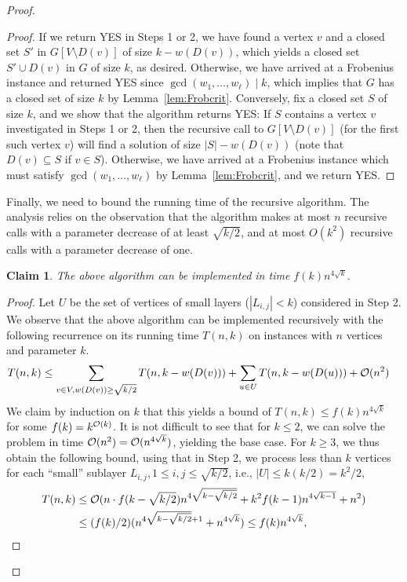\documentclass[10pt,a4paper]{article}
\theoremstyle{plain}
\newtheorem{claim}[thm]{Claim}
\newcommand{\Oh}{{\cal O}}
\newcommand{\divides}{\mid}
\newcommand{\cqed}{}
\begin{document}
\begin{proof}
\begin{proof}
If we return YES in Steps 1 or 2, we have found a vertex $v$ and a closed set $S'$ in $G[V\setminus D(v)]$ of size $k-w(D(v))$, which yields a closed set $S'\cup D(v)$ in $G$ of size $k$, as desired. Otherwise, we have arrived at a Frobenius instance and returned YES since $\gcd(w_1,\dots, w_\ell)\divides k$, which implies that $G$ has a closed set of size $k$ by Lemma~\ref{lem:Frobcrit}.
%
Conversely, fix a closed set $S$ of size $k$, and we show that the algorithm returns YES:
If $S$ contains a vertex $v$ investigated in Steps 1 or 2, then the recursive call to $G[V\setminus D(v)]$ (for the first such vertex $v$) will find a solution of size $|S|-w(D(v))$ (note that $D(v) \subseteq S$ if $v\in S$). Otherwise, we have arrived at a Frobenius instance which must satisfy $\gcd(w_1,\dots, w_\ell)$ by Lemma~\ref{lem:Frobcrit}, and we return YES.
\cqed\end{proof}
%
Finally, we need to bound the running time of the recursive algorithm. The analysis relies on the observation that the algorithm makes at most $n$ recursive calls with a parameter decrease of at least $\sqrt{k/2}$, and at most $O(k^2)$ recursive calls with a parameter decrease of one.
\begin{claim}\label{cl:imp2}
The above algorithm can be implemented in time $f(k) n^{4\sqrt{k}}$.
\end{claim}
\begin{proof}
Let $U$ be the set of vertices of small layers ($|L_{i,j}| < k$) considered in Step 2. We observe that the above algorithm can be implemented recursively with the following recurrence on its running time $T(n,k)$ on instances with $n$ vertices and parameter $k$.
\begin{align*}
T(n,k) & \le \sum_{v\in V, w(D(v)) \ge \sqrt{k/2}} T(n, k-w(D(v))) + \sum_{u \in U} T(n,k-w(D(u))) + \Oh(n^2) 
\end{align*}
We claim by induction on $k$ that this yields a bound of $T(n,k) \le f(k) n^{4\sqrt{k}}$ for some $f(k) = k^{\Oh(k)}$. It is not difficult to see that for $k\le 2$, we can solve the problem in time $\Oh(n^2) = \Oh(n^{4\sqrt{k}})$, yielding the base case. For $k\ge 3$, we thus obtain the following bound, using that in Step 2, we process less than $k$ vertices for each ``small'' sublayer $L_{i,j}, 1\le i,j \le \sqrt{k/2}$, i.e., $|U|\le k (k/2) = k^2/2$,
\begin{align*}
T(n,k) & \le \Oh(n \cdot f(k-\sqrt{k/2}) n^{4\sqrt{k-\sqrt{k/2}}} + k^2 f(k-1) n^{4\sqrt{k-1}} + n^2) \\
   & \le (f(k)/2) (n^{4\sqrt{k-\sqrt{k/2}}+1} + n^{4\sqrt{k}}) \le f(k)n^{4\sqrt{k}},

\end{align*}
\end{proof}
\end{proof}
\end{document}
